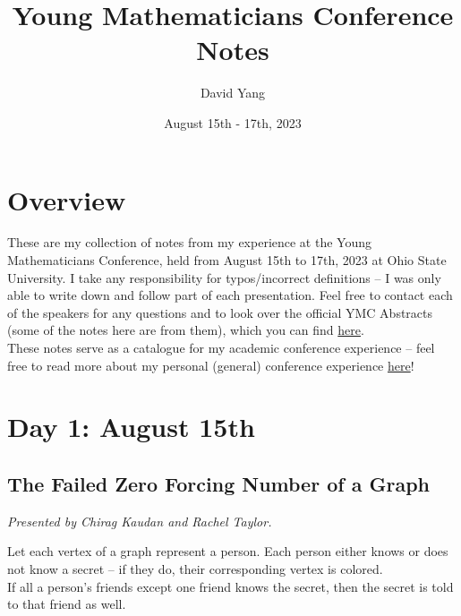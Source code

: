 \documentclass[12pt]{amsart}
\title{Young Mathematicians Conference Notes}
\author{David Yang}
\date{August 15th - 17th, 2023}
\begin{document}
\maketitle

\setcounter{section}{-1}
\section{Overview}

These are my collection of notes from my experience at the Young Mathematicians Conference, held from August 15th to 17th, 2023 at Ohio State University. 
I take any responsibility for typos/incorrect definitions -- I was only able to write down and follow part of each presentation. Feel free to contact each of the speakers for any questions and to look over the official YMC Abstracts (some of the notes here are from them), which you can find \href{https://ymc.osu.edu/sites/default/files/2023-08/ymc_2023-2.pdf}{here}. \\

These notes serve as a catalogue for my academic conference experience -- feel free to read more about my personal (general) conference experience \href{https://github.com/dyang5/CirclePackingsResearch/blob/main/Conferences/writeups/YMC_Writeup.md}{here}!

\vspace{2cm}
\section{Day 1: August 15th}

\vspace{0.25cm}


\subsection{The Failed Zero Forcing Number of a Graph}

\textit{}
\vspace{0.25cm}

\textit{Presented by Chirag Kaudan and Rachel Taylor.}

\begin{definition}
Let each vertex of a graph represent a person. Each person either knows or does not know a secret -- if they do, their corresponding vertex is colored. \\

If all a person's friends except one friend knows the secret, then the secret is told to that friend as well.\end{definition}
\end{document}
